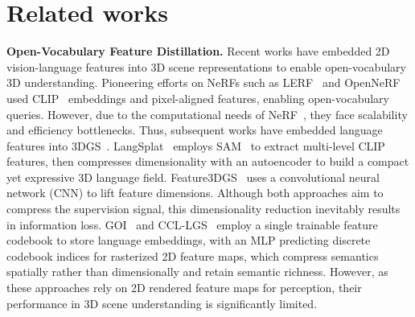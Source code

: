 \section{Related works}
\label{sec:releated_works}

\textbf{Open-Vocabulary Feature Distillation.}
Recent works have embedded 2D vision-language features into 3D scene representations to enable open-vocabulary 3D understanding. Pioneering efforts on NeRFs such as LERF~\cite{kerr2023lerf} and OpenNeRF~\cite{engelmann2024opennerf} used CLIP~\cite{radford2021clip} embeddings and pixel-aligned features, enabling open-vocabulary queries.
However, due to the computational needs of NeRF~\cite{mildenhall2020nerf}, they face scalability and efficiency bottlenecks. Thus, subsequent works have embedded language features into 3DGS~\cite{zuo2024fmgs, shi2024language, zhou2024feature}. LangSplat~\cite{qin2024langsplat} employs SAM~\cite{kirillov2023sam} to extract multi-level CLIP features, then compresses dimensionality with an autoencoder to build a compact yet expressive 3D language field. Feature3DGS~\cite{zhou2024feature} uses a convolutional neural network (CNN) to lift feature dimensions. Although both approaches aim to compress the supervision signal, this dimensionality reduction inevitably results in information loss. GOI~\cite{goi2024} and CCL-LGS~\cite{tian2025ccl} employ a single trainable feature codebook to store language embeddings, with an MLP predicting discrete codebook indices for rasterized 2D feature maps, which compress semantics spatially rather than dimensionally and retain semantic richness. However, as these approaches rely on 2D rendered feature maps for perception, their performance in 3D scene understanding is significantly limited. 

